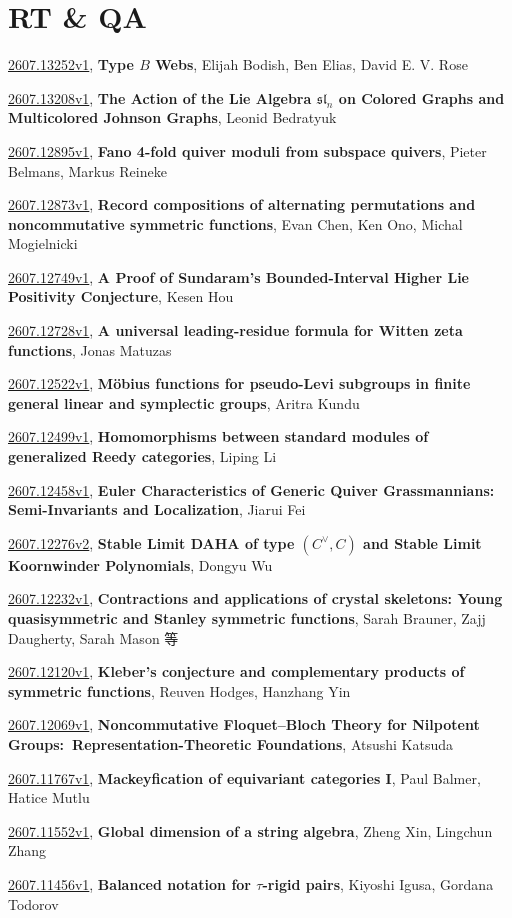 \documentclass[9pt, a4paper]{article}
\theoremstyle{plain}
\theoremstyle{definition}
\theoremstyle{remark}
\newcommand{\arxiv}[3]{\href{https://arxiv.org/abs/#1}{#1}, \textbf{\textcolor{arxivblue}{#2}}, #3}
\begin{document}
\section{RT \& QA}
\arxiv{2607.13252v1}{Type $B$ Webs}{Elijah Bodish, Ben Elias, David E. V. Rose}

\arxiv{2607.13208v1}{The Action of the Lie Algebra $\mathfrak{sl}_n$ on Colored Graphs and Multicolored Johnson Graphs}{Leonid Bedratyuk}

\arxiv{2607.12895v1}{Fano 4-fold quiver moduli from subspace quivers}{Pieter Belmans, Markus Reineke}

\arxiv{2607.12873v1}{Record compositions of alternating permutations and noncommutative symmetric functions}{Evan Chen, Ken Ono, Michal Mogielnicki}

\arxiv{2607.12749v1}{A Proof of Sundaram's Bounded-Interval Higher Lie Positivity Conjecture}{Kesen Hou}

\arxiv{2607.12728v1}{A universal leading-residue formula for Witten zeta functions}{Jonas Matuzas}

\arxiv{2607.12522v1}{Möbius functions for pseudo-Levi subgroups in finite general linear and symplectic groups}{Aritra Kundu}

\arxiv{2607.12499v1}{Homomorphisms between standard modules of generalized Reedy categories}{Liping Li}

\arxiv{2607.12458v1}{Euler Characteristics of Generic Quiver Grassmannians: Semi-Invariants and Localization}{Jiarui Fei}

\arxiv{2607.12276v2}{Stable Limit DAHA of type $(C^{\vee},C)$ and Stable Limit Koornwinder Polynomials}{Dongyu Wu}

\arxiv{2607.12232v1}{Contractions and applications of crystal skeletons: Young quasisymmetric and Stanley symmetric functions}{Sarah Brauner, Zajj Daugherty, Sarah Mason 等}

\arxiv{2607.12120v1}{Kleber's conjecture and complementary products of symmetric functions}{Reuven Hodges, Hanzhang Yin}

\arxiv{2607.12069v1}{Noncommutative Floquet--Bloch Theory for Nilpotent Groups:\ Representation-Theoretic Foundations}{Atsushi Katsuda}

\arxiv{2607.11767v1}{Mackeyfication of equivariant categories I}{Paul Balmer, Hatice Mutlu}

\arxiv{2607.11552v1}{Global dimension of a string algebra}{Zheng Xin, Lingchun Zhang}

\arxiv{2607.11456v1}{Balanced notation for $τ$-rigid pairs}{Kiyoshi Igusa, Gordana Todorov}
\end{document}
